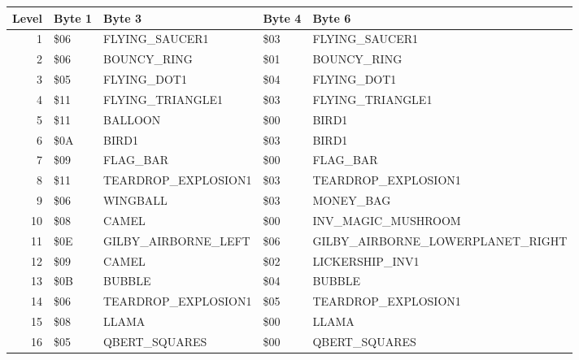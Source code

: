 
\begin{figure}[H]
  {
  \setlength{\tabcolsep}{3.0pt}
  \setlength\cmidrulewidth{\heavyrulewidth} %
  \begin{adjustbox}{width=\textwidth}

\begin{tabular}{rllll}
\toprule
   Level & Byte 1    & Byte 3               & Byte 4    & Byte 6                           \\
\midrule
       1 & \$06       & FLYING\_SAUCER1       & \$03       & FLYING\_SAUCER1                   \\
       2 & \$06       & BOUNCY\_RING          & \$01       & BOUNCY\_RING                      \\
       3 & \$05       & FLYING\_DOT1          & \$04       & FLYING\_DOT1                      \\
       4 & \$11       & FLYING\_TRIANGLE1     & \$03       & FLYING\_TRIANGLE1                 \\
       5 & \$11       & BALLOON              & \$00       & BIRD1                            \\
       6 & \$0A       & BIRD1                & \$03       & BIRD1                            \\
       7 & \$09       & FLAG\_BAR             & \$00       & FLAG\_BAR                         \\
       8 & \$11       & TEARDROP\_EXPLOSION1  & \$03       & TEARDROP\_EXPLOSION1              \\
       9 & \$06       & WINGBALL             & \$03       & MONEY\_BAG                        \\
      10 & \$08       & CAMEL                & \$00       & INV\_MAGIC\_MUSHROOM               \\
      11 & \$0E       & GILBY\_AIRBORNE\_LEFT  & \$06       & GILBY\_AIRBORNE\_LOWERPLANET\_RIGHT \\
      12 & \$09       & CAMEL                & \$02       & LICKERSHIP\_INV1                  \\
      13 & \$0B       & BUBBLE               & \$04       & BUBBLE                           \\
      14 & \$06       & TEARDROP\_EXPLOSION1  & \$05       & TEARDROP\_EXPLOSION1              \\
      15 & \$08       & LLAMA                & \$00       & LLAMA                            \\
      16 & \$05       & QBERT\_SQUARES        & \$00       & QBERT\_SQUARES                    \\

\end{tabular}
\end{adjustbox}}
\end{figure}
